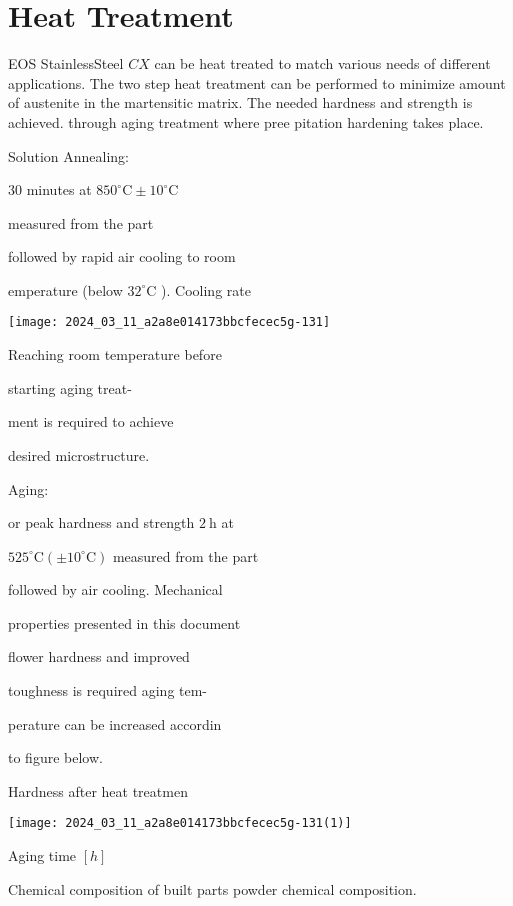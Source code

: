 \documentclass[10pt]{article}
\begin{document}
\section*{Heat Treatment}
EOS StainlessSteel $C X$ can be heat treated to match various needs of different applications. The two step heat treatment can be performed to minimize amount of austenite in the martensitic matrix. The needed hardness and strength is achieved. through aging treatment where pree pitation hardening takes place.

Solution Annealing:

30 minutes at $850^{\circ} \mathrm{C} \pm 10^{\circ} \mathrm{C}$

measured from the part

followed by rapid air cooling to room

emperature (below $32^{\circ} \mathrm{C}$ ). Cooling rate

\begin{center}
\texttt{[image: 2024\_03\_11\_a2a8e014173bbcfecec5g-131]}
\end{center}

Reaching room temperature before

starting aging treat-

ment is required to achieve

desired microstructure.

Aging:

or peak hardness and strength $2 \mathrm{~h}$ at

$525^{\circ} \mathrm{C}\left( \pm 10^{\circ} \mathrm{C}\right)$ measured from the part

followed by air cooling. Mechanical

properties presented in this document

flower hardness and improved

toughness is required aging tem-

perature can be increased accordin

to figure below.

Hardness after heat treatmen

\begin{center}
\texttt{[image: 2024\_03\_11\_a2a8e014173bbcfecec5g-131(1)]}
\end{center}

Aging time $[h]$

Chemical composition of built parts powder chemical composition.
\end{document}
